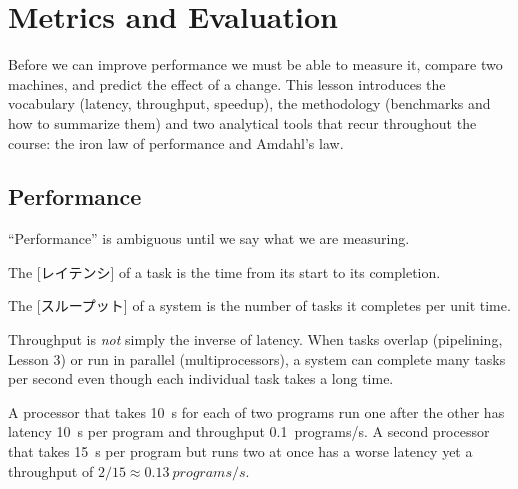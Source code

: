 \documentclass[../main.tex]{subfiles}
\begin{document}
\chapter{Metrics and Evaluation}

Before we can improve performance we must be able to measure it, compare
two machines, and predict the effect of a change.  This lesson introduces
the vocabulary (latency, throughput, speedup), the methodology (benchmarks
and how to summarize them) and two analytical tools that recur throughout
the course: the iron law of performance and Amdahl's law.

\section{Performance}

\enquote{Performance} is ambiguous until we say what we are
measuring.

\begin{definition}[Latency]
  The [レイテンシ] of a task is the time from its start to its
  completion.
\end{definition}

\begin{definition}[Throughput]
  The [スループット] of a system is the number of tasks it
  completes per unit time.
\end{definition}

Throughput is \emph{not} simply the inverse of latency.  When tasks overlap
(pipelining, Lesson 3) or run in parallel (multiprocessors), a system can
complete many tasks per second even though each individual task takes a
long time.

\begin{example}
  A processor that takes \SI{10}{\second} for each of two programs run one
  after the other has latency \SI{10}{\second} per program and throughput
  \SI{0.1}{programs/s}.  A second processor that takes \SI{15}{\second} per
  program but runs two at once has a worse latency yet a throughput of
  $2/15 \approx \SI{0.13}{programs/s}$.
\end{example}
\end{document}
